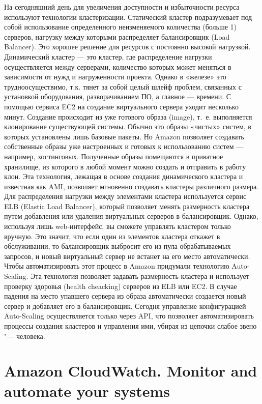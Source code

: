 \documentclass[10pt, a5paper]{article}
\begin{document}
На сегодняшний день для увеличения доступности и избыточности ресурса используют технологии кластеризации. Статический кластер подразумевает под собой использование определенного неизменяемого количества (больше 1) серверов, нагрузку между которыми распределяет балансировщик (Load Balancer). Это хорошее решение для ресурсов с постоянно высокой нагрузкой. Динамический кластер --- это кластер, где распределение нагрузки осуществляется между серверами, количество которых может меняться в зависимости от нужд и нагруженности проекта. Однако в «железе» это трудноосуществимо, т.к. тянет за собой целый шлейф проблем, связанных с установкой оборудования, разворачиванием ПО, а главное --- времени. С помощью сервиса EC2 на создание виртуального сервера уходит несколько минут. Создание происходит из уже готового образа (image), т.~е. выполняется клонирование существующей системы. Обычно это образы «чистых» систем, в которых установлены лишь базовые пакеты. Но Amazon позволяет создавать собственные образы уже настроенных и готовых к использованию систем --- например, хостинговых. Полученные образы помещаются в приватное хранилище, из которого в любой момент можно создать и отправить в работу клон. Эта технология, лежащая в основе создания динамического кластера и известная как AMI, позволяет мгновенно создавать кластеры различного размера. Для распределения нагрузки между элементами кластера используется сервис ELB (Elastic Load Balancer), который позволяет менять размерность кластера путем добавления или удаления виртуальных серверов в балансировщик. Однако, используя лишь web-интерфейс, вы сможете управлять кластером только вручную. Это значит, что если один из элементов кластера откажет в обслуживании, то балансировщик выбросит его из пула обрабатываемых запросов, и новый виртуальный сервер не встанет на его место автоматически. Чтобы автоматизировать этот процесс в Amazon придумали технологию Auto-Scaling. Эта технология позволяет задавать размерность кластера и использует проверку здоровья (health cheacking) серверов из ELB или EC2. В случае падения на место упавшего сервера из образа автоматически создается новый сервер и добавляет его в балансировщик. Сегодня управление конфигурацией Auto-Scaling осуществляется только через API, что позволяет автоматизировать процессы создания кластеров и управления ими, убирая из цепочки слабое звено "--- человека.

\section*{Amazon CloudWatch. Monitor and automate your systems}
\end{document}
